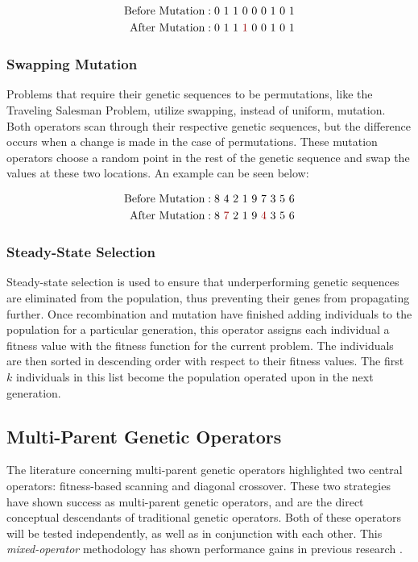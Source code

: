 \begin{align*}
\text{Before Mutation} &: 0~1~1~0~0~0~1~0~1 			\\  
\text{After Mutation} &: 0~1~1~{\color{myred}1}~0~0~1~0~1  		
\end{align*}

\subsubsection*{Swapping Mutation}
Problems that require their genetic sequences to be permutations, like the Traveling Salesman Problem, utilize swapping, instead of uniform, mutation. Both operators scan through their respective genetic sequences, but the difference occurs when a change is made in the case of permutations. These mutation operators choose a random point in the rest of the genetic sequence and swap the values at these two locations. An example can be seen below:

\begin{align*}
\text{Before Mutation} &: 8~4~2~1~9~7~3~5~6 			\\
\text{After Mutation} &:  8~{\color{myred}7}~2~1~9~{\color{myred}4}~3~5~6		
\end{align*}

\subsubsection*{Steady-State Selection}
Steady-state selection is used to ensure that underperforming genetic sequences are eliminated from the population, thus preventing their genes from propagating further. Once recombination and mutation have finished adding individuals to the population for a particular generation, this operator assigns each individual a fitness value with the fitness function for the current problem. The individuals are then sorted in descending order with respect to their fitness values. The first $k$ individuals in this list become the population operated upon in the next generation.

\subsection*{Multi-Parent Genetic Operators}
The literature concerning multi-parent genetic operators highlighted two central operators: fitness-based scanning and diagonal crossover. These two strategies have shown success as multi-parent genetic operators, and are the direct conceptual descendants of traditional genetic operators. Both of these operators will be tested independently, as well as in conjunction with each other. This \emph{mixed-operator} methodology has shown performance gains in previous research \cite{Smith04}.


